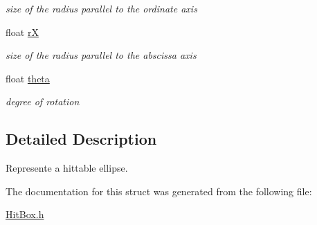 \begin{DoxyCompactItemize}
\begin{DoxyCompactList}\small\item\em size of the radius parallel to the ordinate axis \end{DoxyCompactList}\item 
float \hyperlink{structCircleSDL2_a3e1bbbd4b8e28aaa64d556b5d44c38c7}{rX}\hypertarget{structCircleSDL2_a3e1bbbd4b8e28aaa64d556b5d44c38c7}{}\label{structCircleSDL2_a3e1bbbd4b8e28aaa64d556b5d44c38c7}

\begin{DoxyCompactList}\small\item\em size of the radius parallel to the abscissa axis \end{DoxyCompactList}\item 
float \hyperlink{structCircleSDL2_aa6558f4c810b4ef38b1c5bc7cac27634}{theta}\hypertarget{structCircleSDL2_aa6558f4c810b4ef38b1c5bc7cac27634}{}\label{structCircleSDL2_aa6558f4c810b4ef38b1c5bc7cac27634}

\begin{DoxyCompactList}\small\item\em degree of rotation \end{DoxyCompactList}\end{DoxyCompactItemize}


\subsection{Detailed Description}
Represente a hittable ellipse. 

The documentation for this struct was generated from the following file\+:\begin{DoxyCompactItemize}
\item 
\hyperlink{HitBox_8h}{Hit\+Box.\+h}\end{DoxyCompactItemize}
